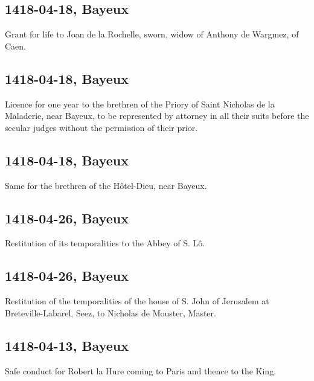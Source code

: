 \documentclass[a4paper,12pt,twoside]{book}
\begin{document}
            \subsection{1418-04-18, Bayeux}
            
                     Grant for life to Joan de la Rochelle, sworn, widow of Anthony de Wargmez, of Caen.
                  
            \subsection{1418-04-18, Bayeux}
            
                     Licence for one year to the brethren of the Priory of Saint Nicholas de la Maladerie, near Bayeux, to be represented by attorney in all their suits before the secular judges without the permission of their prior.
                  
            \subsection{1418-04-18, Bayeux}
            
                     Same for the brethren of the Hôtel-Dieu, near Bayeux.
                  
            \subsection{1418-04-26, Bayeux}
            
                     Restitution of its temporalities to the Abbey of S. Lô.
                  
            \subsection{1418-04-26, Bayeux}
            
                     Restitution of the temporalities of the house of S. John of Jerusalem at Breteville-Labarel, Seez, to Nicholas de Mouster, Master.
                  
            \subsection{1418-04-13, Bayeux}
            
                     Safe conduct for Robert la Hure coming to Paris and thence to the King.
                  
\end{document}
